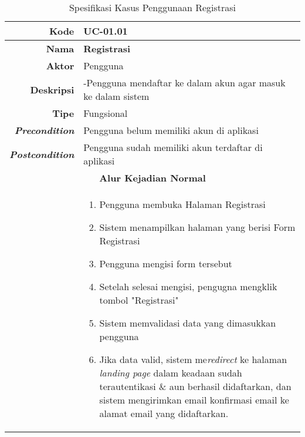 \begin{table}[H]
	\centering
	\caption{Spesifikasi Kasus Penggunaan Registrasi}
	\label{uc01.01}
	\begin{tabular}{|r|p{8cm}|}
		\hline
		\textbf{Kode}                                                    & UC-01.01                                                     \\ \hline
		\textbf{Nama}                                                    & \textbf{Registrasi}                                         \\ \hline
		\textbf{Aktor}                                                   & Pengguna                                                    \\ \hline
		\textbf{Deskripsi}                                               & 
			-Pengguna mendaftar ke dalam akun agar masuk ke dalam sistem \\ \hline
		\textbf{Tipe}                                                    & Fungsional                                                  \\ \hline
		\textbf{\textit{Precondition}}
			& Pengguna belum memiliki akun di aplikasi                    \\ \hline
		\textbf{\textit{Postcondition}} 
			& Pengguna sudah memiliki akun terdaftar di aplikasi          \\ \hline
		\multicolumn{2}{|c|}{\textbf{Alur Kejadian Normal}}                                                                            \\ \hline
		\multicolumn{1}{|l|}{}                                           & 
			\begin{enumerate}
				\item Pengguna membuka Halaman Registrasi
				\item \label{uc0101-show1page}Sistem menampilkan halaman yang berisi Form Registrasi
				\item Pengguna mengisi form tersebut
				\item Setelah selesai mengisi, pengugna mengklik tombol "Registrasi"
				\item \label{al-0101-a} Sistem memvalidasi data yang dimasukkan pengguna
				\item Jika data valid, sistem me\textit{redirect} ke halaman \textit{landing page} dalam keadaan sudah terautentikasi \& aun berhasil didaftarkan, dan sistem mengirimkan email konfirmasi email ke alamat email yang didaftarkan.
			\end{enumerate}
		\\ \hline

\end{tabular}
\end{table}
